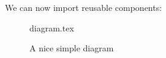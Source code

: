 \documentclass[float=false, crop=false]{standalone}
\begin{document}
We can now import reusable components:
 
\begin{figure}[ht]
    \centering
    {diagram.tex}
     
    \label{fig:tikzexample}
    \caption{A nice simple diagram}
\end{figure}
 
\end{document}
